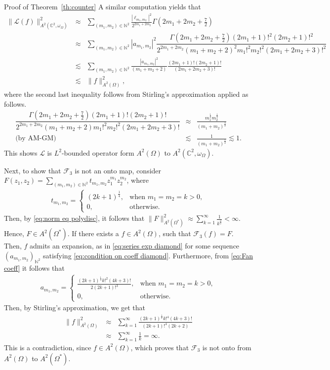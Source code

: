 \documentclass[11pt, oneside, reqno]{amsart}
\numberwithin{equation}{section}
\theoremstyle{definition}
\newcommand{\beas}{\begin{eqnarray*}}
\newcommand{\eeas}{\end{eqnarray*}}
\newcommand{\C}{\mathbb C}
\newcommand{\N}{\mathbb N}
\newcommand{\F}{\mathcal F}
\newcommand{\ltt}{\left(}
\newcommand{\rtt}{\right)}
\newcommand{\Om}{\Omega}
\begin{document}
{\begin{section}{Proof of Theorem~\ref{th:counter}}
A similar computation yields that
\beas
\|\mathcal L (f)\|_{A^2(\C^2,\omega_\Om)}^2&\approx&\sum\limits_{(m_1,m_2)\in\N^2}\frac{|\ell_{m_1,m_2}|^2}{2^{2m_1+2m_2}}{\Gamma\ltt2m_1+2m_2+\frac{7}{2}\rtt}\\
&\approx&\sum\limits_{(m_1,m_2)\in\N^2}{|a_{m_1,m_2}|^2}\dfrac{\Gamma\ltt2m_1+2m_2+\frac{7}{2}\rtt (2m_1+1)!^2(2m_2+1)!^2}{2^{2m_1+2m_2}(m_1+m_2+2)^2m_1!^2m_2!^2(2m_1+2m_2+3)!^2}\\
&\lesssim& \sum_{(m_1,m_2)\in \N^2}\frac{|a_{m_1,m_2}|^2}{(m_1+m_2+2)}\frac{{\ltt 2m_1+1\rtt!}{\ltt 2m_2+1\rtt!}}{{\ltt 2m_1+2m_2+3\rtt!}}\\
&\lesssim& \|f\|_{A^2\ltt\Om\rtt}^2, 
\eeas
where the second last inequality follows from Stirling's approximation applied as follows.
\beas
\dfrac{\Gamma\ltt2m_1+2m_2+\frac{7}{2}\rtt (2m_1+1)!(2m_2+1)!}{2^{2m_1+2m_2}(m_1+m_2+2)m_1!^2m_2!^2(2m_1+2m_2+3)!}&\approx& \frac{m_1^{\frac{1}{2}} m_2^{\frac{1}{2}}}{(m_1+m_2)^{\frac{3}{2}}}\\
\text{(by AM-GM)} &\lesssim& \frac{1}{(m_1+m_2)^{\frac{1}{2}}}\lesssim 1.
\eeas
This shows $\mathcal L$ is $L^2$-bounded operator form $A^2(\Om)$ to $A^2(
\C^2,\omega_\Om)$.

  Next, to show that $\F_3$ is not an onto map, consider $F\ltt z_1,z_2\rtt=\sum\limits_{(m_1,m_2)\in \N^2} t_{m_1,m_2} z_1^{m_1} z_2^{m_2}$, where
 \begin{align*}
      t_{m_1,m_2}=\begin{cases}
         (2k+1)^{\frac{1}{4}},& \text{when } m_1=m_2=k>0,\\
          0,&\text{otherwise}.
      \end{cases}  
    \end{align*}
    Then, by \eqref{eq:norm eq polydisc}, it follows that $\|F\|_{A^2\ltt\Om^*\rtt}^2\approx \sum\limits_{k=1}^\infty \frac{1}{k^{\frac{3}{2}}}<\infty$. Hence, $F\in A^2\ltt\Om^*\rtt$. If there exists a $f\in A^2\ltt\Om\rtt$, such that $\F_3(f)=F$. Then, $f$ admits an expansion, as in \eqref{eq:series exp diamond} for some sequence $\ltt a_{m_1,m_2}\rtt_{\N^2}$ satisfying \eqref{eq:condition on coeff diamond}. Furthermore, from \eqref{eq:Fan coeff} it follows that
    \begin{align*}
      a_{m_1,m_2}=\begin{cases}
        \frac{(2k+1)^{\frac{1}{4}}k!^2(4k+3)!}{2(2k+1)!^3},& \text{when } m_1=m_2=k>0,\\
          0,&\text{otherwise}.
      \end{cases}  
    \end{align*}
    Then, by Stirling's approximation, we get that
    \beas
    \|f\|_{A^2\ltt\Om\rtt}^2&\approx& \sum_{k=1}^\infty \frac{(2k+1)^{\frac{1}{2}}k!^4(4k+3)!}{(2k+1)!^4(2k+2)}\\
&\approx& \sum_{k=1}^\infty \frac{1}{k}=\infty.    
    \eeas
    This is a contradiction, since $f\in A^2\ltt\Om\rtt$, which proves that $\F_3$ is not onto from $A^2\ltt\Om\rtt$ to $A^2\ltt\Om^*\rtt$.
    

\end{section}}
\end{document}
